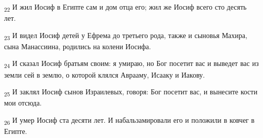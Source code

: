 \begin{tcolorbox}
\textsubscript{22} И жил Иосиф в Египте сам и дом отца его; жил же Иосиф всего сто десять лет.
\end{tcolorbox}
\begin{tcolorbox}
\textsubscript{23} И видел Иосиф детей у Ефрема до третьего рода, также и сыновья Махира, сына Манассиина, родились на колени Иосифа.
\end{tcolorbox}
\begin{tcolorbox}
\textsubscript{24} И сказал Иосиф братьям своим: я умираю, но Бог посетит вас и выведет вас из земли сей в землю, о которой клялся Аврааму, Исааку и Иакову.
\end{tcolorbox}
\begin{tcolorbox}
\textsubscript{25} И заклял Иосиф сынов Израилевых, говоря: Бог посетит вас, и вынесите кости мои отсюда.
\end{tcolorbox}
\begin{tcolorbox}
\textsubscript{26} И умер Иосиф ста десяти лет. И набальзамировали его и положили в ковчег в Египте.
\end{tcolorbox}
